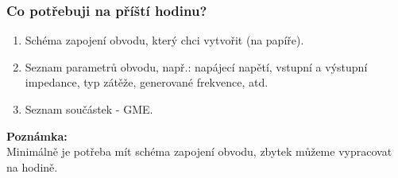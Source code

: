 \documentclass{beamer}
\begin{document}
	\begin{frame}
    \frametitle{Co potřebuji na příští hodinu?}
    
    \begin{enumerate}
      \item Schéma zapojení obvodu, který chci vytvořit (na papíře).
      \item Seznam parametrů obvodu, např.: napájecí napětí, vstupní a výstupní
      impedance, typ zátěže, generované frekvence, atd.
      \item Seznam součástek - GME.
    \end{enumerate}
    
    
    \textbf{Poznámka:} \\
    Minimálně je potřeba mít schéma zapojení obvodu, zbytek můžeme vypracovat na hodině.
	
	\end{frame}
\end{document}
